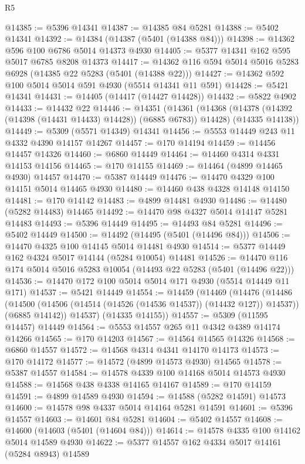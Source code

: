 \begin{lexlean}{R5}
\begin{coremodule}
@14385 := @5396 @14341
@14387 := @14385 @84 @5281
@14388 := @5402 @14341
@14392 := @14384 (@14387 (@5401 (@14388 @84)))
@14398 := @14362 @596 @100 @6786 @5014 @14373 @4930
@14405 := @5377 @14341 @162 @595 @5017 @6785 @8208 @14373
@14417 := @14362 @116 @594 @5014 @5016 @5283 @6928 (@14385 @22 @5283 (@5401 (@14388 @22)))
@14427 := @14362 @592 @100 @5014 @5014 @591 @4930 (@5514 @14341 @11 @591)
@14428 := @5421 @14341
@14431 := @14405 (@14417 (@14427 @14428))
@14432 := @5822 @4902
@14433 := @14432 @22
@14446 := @14351
    (@14361
      (@14368 (@14378 (@14392 (@14398 (@14431 @14433) @14428)) (@6885 @6783)) @14428)
      (@14335 @14138))
@14449 := @5309 (@5571 @14349) @14341
@14456 := @5553 @14449 @243 @11 @4332 @4390 @14157 @14267
@14457 := @170 @14194
@14459 := @14456 @14457 @14326
@14460 := @6860 @14449
@14464 := @14460 @4314 @4331 @14153 @14156
@14465 := @170 @14155
@14469 := @14464 (@4899 @14465 @4930) @14457
@14470 := @5387 @14449
@14476 := @14470 @4329 @100 @14151 @5014 @14465 @4930
@14480 := @14460 @438 @4328 @14148 @14150
@14481 := @170 @14142
@14483 := @4899 @14481 @4930
@14486 := @14480 (@5282 @14483) @14465
@14492 := @14470 @98 @4327 @5014 @14147 @5281 @14483
@14493 := @5396 @14449
@14495 := @14493 @84 @5281
@14496 := @5402 @14449
@14500 := @14492 (@14495 (@5401 (@14496 @84)))
@14506 := @14470 @4325 @100 @14145 @5014 @14481 @4930
@14514 := @5377 @14449 @162 @4324 @5017 @14144 (@5284 @10054) @14481
@14526 := @14470 @116 @174 @5014 @5016 @5283 @10054 (@14493 @22 @5283 (@5401 (@14496 @22)))
@14536 := @14470 @172 @100 @5014 @5014 @171 @4930 (@5514 @14449 @11 @171)
@14537 := @5421 @14449
@14554 := @14459
    (@14469
      (@14476
        (@14486
          (@14500 (@14506 (@14514 (@14526 (@14536 @14537)) (@14432 @127)) @14537))
          (@6885 @14142))
        @14537)
      (@14335 @14155))
@14557 := @5309 (@11595 @14457) @14449
@14564 := @5553 @14557 @265 @11 @4342 @4389 @14174 @14266
@14565 := @170 @14203
@14567 := @14564 @14565 @14326
@14568 := @6860 @14557
@14572 := @14568 @4314 @4341 @14170 @14173
@14573 := @170 @14172
@14577 := @14572 (@4899 @14573 @4930) @14565
@14578 := @5387 @14557
@14584 := @14578 @4339 @100 @14168 @5014 @14573 @4930
@14588 := @14568 @438 @4338 @14165 @14167
@14589 := @170 @14159
@14591 := @4899 @14589 @4930
@14594 := @14588 (@5282 @14591) @14573
@14600 := @14578 @98 @4337 @5014 @14164 @5281 @14591
@14601 := @5396 @14557
@14603 := @14601 @84 @5281
@14604 := @5402 @14557
@14608 := @14600 (@14603 (@5401 (@14604 @84)))
@14614 := @14578 @4335 @100 @14162 @5014 @14589 @4930
@14622 := @5377 @14557 @162 @4334 @5017 @14161 (@5284 @8943) @14589

\end{coremodule}
\end{lexlean}
